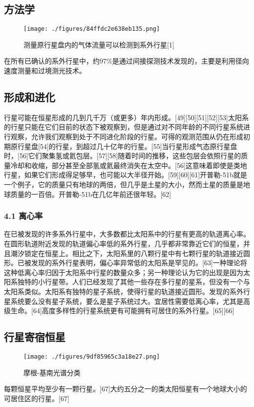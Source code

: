 \subsection{方法学}
\begin{figure}[ht]
\centering
\texttt{[image: ./figures/84ffdc2e638eb135.png]}
\caption{测量原行星盘内的气体流量可以检测到系外行星[1]} \label{fig_TYXWXX_8}
\end{figure}
在所有已确认的系外行星中，约97\%是通过间接探测技术发现的，主要是利用径向速度测量和过境测光技术。

\subsection{形成和进化}
行星可能在恒星形成的几到几千万（或更多）年内形成。[49][50][51][52][53]太阳系的行星只能在它们目前的状态下被观察到，但是通过对不同年龄的不同行星系统进行观察，允许我们观察到处于不同进化阶段的行星。可得的观测范围从仍在形成初期原行星盘[54]的行星，到超过几十亿年的行星。[55]当行星形成气态原行星盘时，[56]它们聚集氢或氦包层。[57][58]随着时间的推移，这些包层会依照行星的质量冷却和收缩，部分甚至全部氢或氦最终消失在太空中。[56]这意味着即使是类地行星，如果它们形成得足够早，也可能以大半径开始。[59][60][61]开普勒-51b就是一个例子，它的质量只有地球的两倍，但几乎是土星的大小，然而土星的质量是地球质量的一百倍。开普勒-51b在几亿年前还很年轻。[62]
\subsubsection{4.1 离心率}
在已被发现的许多系外行星中，大多数都比太阳系中的行星有更高的轨道离心率。在圆形轨道附近发现的轨道偏心率低的系外行星，几乎都非常靠近它们的恒星，并且潮汐锁定在恒星上。相比之下，太阳系里的八颗行星中有七颗行星的轨道接近圆形。已被发现的系外行星表明，偏心率异常低的太阳系是罕见的。[63]一种理论将这种低离心率归因于太阳系中行星的数量众多；另一种理论认为它的出现是因为太阳系独特的小行星带。人们已经发现了其他一些存在多行星的星系，但没有一个与太阳系类似。太阳系有独特的星子系统，使得行星的轨道接近圆形。发现的系外行星系统要么没有星子系统，要么是星子系统过大。宜居性需要低离心率，尤其是高级生命。[64]高度多样性的行星系统更有可能拥有可居住的系外行星。[65][66]

\subsection{ 行星寄宿恒星}
\begin{figure}[ht]
\centering
\texttt{[image: ./figures/9df85965c3a18e27.png]}
\caption{摩根-基南光谱分类} \label{fig_TYXWXX_9}
\end{figure}
每颗恒星平均至少有一颗行星。[67]大约五分之一的类太阳恒星有一个地球大小的可居住区的行星。[67]

